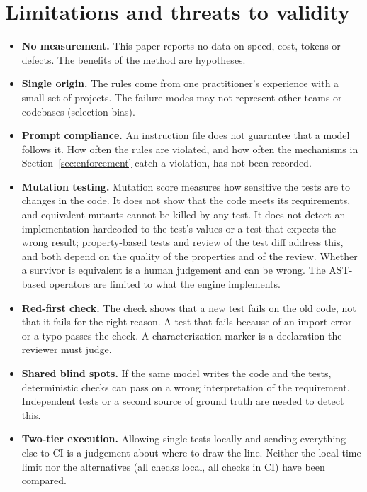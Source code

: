 \documentclass[11pt,a4paper]{article}
\begin{document}
\section{Limitations and threats to validity}
\label{sec:limits}

\begin{itemize}
  \item \textbf{No measurement.} This paper reports no data on speed, cost, tokens or defects. The benefits of the method are hypotheses.
  \item \textbf{Single origin.} The rules come from one practitioner's experience with a small set of projects. The failure modes may not represent other teams or codebases (selection bias).
  \item \textbf{Prompt compliance.} An instruction file does not guarantee that a model follows it. How often the rules are violated, and how often the mechanisms in Section~\ref{sec:enforcement} catch a violation, has not been recorded.
  \item \textbf{Mutation testing.} Mutation score measures how sensitive the tests are to changes in the code. It does not show that the code meets its requirements, and equivalent mutants cannot be killed by any test. It does not detect an implementation hardcoded to the test's values or a test that expects the wrong result; property-based tests and review of the test diff address this, and both depend on the quality of the properties and of the review. Whether a survivor is equivalent is a human judgement and can be wrong. The AST-based operators are limited to what the engine implements.
  \item \textbf{Red-first check.} The check shows that a new test fails on the old code, not that it fails for the right reason. A test that fails because of an import error or a typo passes the check. A characterization marker is a declaration the reviewer must judge.
  \item \textbf{Shared blind spots.} If the same model writes the code and the tests, deterministic checks can pass on a wrong interpretation of the requirement. Independent tests or a second source of ground truth are needed to detect this.
  \item \textbf{Two-tier execution.} Allowing single tests locally and sending everything else to CI is a judgement about where to draw the line. Neither the local time limit nor the alternatives (all checks local, all checks in CI) have been compared.

\end{itemize}
\end{document}
